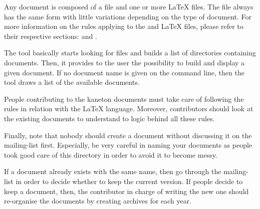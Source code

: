 Any document is composed of a  file and one or more
{\LaTeX} files. The  file always has the same form
with little variations depending on the type of document. For more information
on the rules applying to the  and {\LaTeX} files, please
refer to their respective sections: 
and .

The  tool basically starts looking for  files
and builds a list of directories containing documents. Then, it provides
to the user the possibility to build and display a given document. If no
document name is given on the command line, then the tool draws a list
of the available documents.

People contributing to the kaneton documents must take care of following
the rules in relation with the {\LaTeX} language. Moreover, contributors
should look at the existing documents to understand to logic behind all
these rules.

Finally, note that nobody should create a document without discussing it
on the mailing-list first. Especially, be very careful in naming your
documents as people took good care of this directory in order to avoid
it to become messy.

If a document already exists with the same name, then go through the
mailing-list in order to decide whether to keep the current version. If
people decide to keep a document, then, the contributor in charge of writing
the new one should re-organise the documents by creating archives for
each year.
